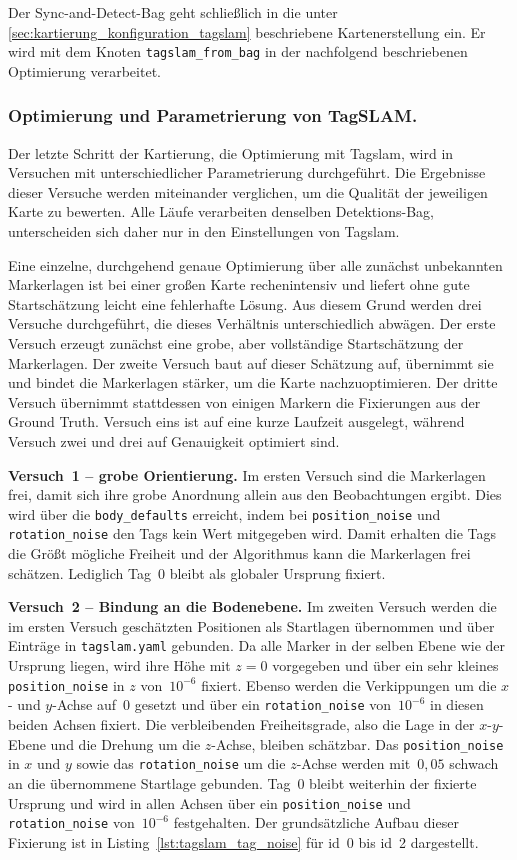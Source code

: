 Der Sync-and-Detect-Bag geht schließlich in die unter \ref{sec:kartierung_konfiguration_tagslam} beschriebene Kartenerstellung ein.
Er wird mit dem Knoten \texttt{tagslam\_from\_bag} in der nachfolgend beschriebenen Optimierung verarbeitet.


\subsubsection*{Optimierung und Parametrierung von TagSLAM.}
\label{sec:parametrierung_tagslam}
Der letzte Schritt der Kartierung, die Optimierung mit Tag\gls{slam}, wird in Versuchen mit unterschiedlicher Parametrierung durchgeführt.
Die Ergebnisse dieser Versuche werden miteinander verglichen, um die Qualität der jeweiligen Karte zu bewerten.
Alle Läufe verarbeiten denselben Detektions-Bag, unterscheiden sich daher nur in den Einstellungen von Tag\gls{slam}.

Eine einzelne, durchgehend genaue Optimierung über alle zunächst unbekannten Markerlagen ist bei einer großen Karte rechenintensiv
und liefert ohne gute Startschätzung leicht eine fehlerhafte Lösung.
Aus diesem Grund werden drei Versuche durchgeführt, die dieses Verhältnis unterschiedlich abwägen.
Der erste Versuch erzeugt zunächst eine grobe, aber vollständige Startschätzung der Markerlagen.
Der zweite Versuch baut auf dieser Schätzung auf, übernimmt sie und bindet die Markerlagen stärker, um die Karte nachzuoptimieren.
Der dritte Versuch übernimmt stattdessen von einigen Markern die Fixierungen aus der Ground Truth.
Versuch eins ist auf eine kurze Laufzeit ausgelegt, während Versuch zwei und drei auf Genauigkeit optimiert sind. 

\textbf{Versuch~1 -- grobe Orientierung.}
Im ersten Versuch sind die Markerlagen frei, damit sich ihre grobe Anordnung allein aus den Beobachtungen ergibt.
Dies wird über die \texttt{body\_defaults} erreicht, indem bei \texttt{position\_noise} und \texttt{rotation\_noise} den Tags kein Wert mitgegeben wird.
Damit erhalten die Tags die Größt mögliche Freiheit und der Algorithmus kann die Markerlagen frei schätzen. 
Lediglich Tag~0 bleibt als globaler Ursprung fixiert.

\textbf{Versuch~2 -- Bindung an die Bodenebene.}
Im zweiten Versuch werden die im ersten Versuch geschätzten Positionen als Startlagen übernommen und über Einträge in \texttt{tagslam.yaml} gebunden.
Da alle Marker in der selben Ebene wie der Ursprung liegen, wird ihre Höhe mit $z=0$ vorgegeben und 
über ein sehr kleines \texttt{position\_noise} in $z$ von~$10^{-6}$ fixiert.
Ebenso werden die Verkippungen um die $x$- und $y$-Achse auf~$0$ gesetzt und über ein \texttt{rotation\_noise} von~$10^{-6}$ in diesen beiden Achsen fixiert.
Die verbleibenden Freiheitsgrade, also die Lage in der $x$-$y$-Ebene und die Drehung um die $z$-Achse, bleiben schätzbar.
Das \texttt{position\_noise} in $x$ und $y$ sowie das \texttt{rotation\_noise} um die $z$-Achse werden mit~$0{,}05$ schwach an die übernommene Startlage gebunden.
Tag~0 bleibt weiterhin der fixierte Ursprung und wird in allen Achsen über ein \texttt{position\_noise} und \texttt{rotation\_noise} von~$10^{-6}$ festgehalten.
Der grundsätzliche Aufbau dieser Fixierung ist in Listing~\ref{lst:tagslam_tag_noise} für \gls{id}~0 bis \gls{id}~2 dargestellt.

